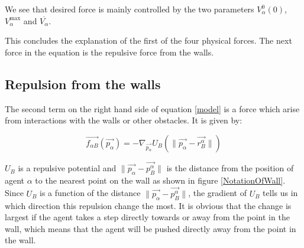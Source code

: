 We see that desired force is mainly controlled by the two parameters $V_{\alpha}^{0} (0)$, 
$V_{\alpha}^{\text{max}}$ and $\overline{V_{\alpha}}$.

This concludes the explanation of the first of the four physical forces. The next 
force in the equation is the repulsive force from the walls.

\subsection{Repulsion from the walls}
The second term on the right hand side of equation \eqref{model} is a force which 
arise from interactions with the walls or other obstacles. It is given by:

\begin{equation}\label{wallpotential}
    \vec{f_{\alpha B}} \left( \vec{p_{\alpha}} \right) =
    - \nabla_{\vec{p_{\alpha}}} U_{B}
    \left( \| \vec{p_{\alpha}} - \vec{r_{B}^{\alpha}} \| \right)
\end{equation}

$U_B$ is a repulsive potential and $\|\vec{p_{\alpha}} - \vec{p_{B}^{\alpha}}\|$ 
is the distance from the position of agent $\alpha$ to the nearest point on the 
wall as shown in figure \ref{NotationOfWall}. Since $U_B$ is a function of the distance 
$\| \vec{p_{\alpha}} - \vec{p_{B}^{\alpha}} \|$, the gradient of $U_B$ tells us in 
which direction this repulsion change the most. It is obvious that the change is 
largest if the agent takes a step directly towards or away from the point in the wall, 
which means that the agent will be pushed directly away from the point in the wall.

